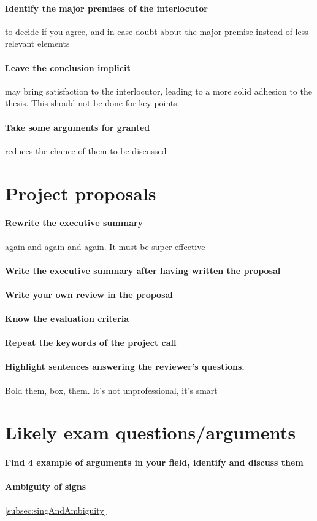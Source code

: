 \documentclass{article}
\begin{document}
\paragraph{Identify the major premises of the interlocutor} to decide if you agree, and in case doubt about the major premise instead of less relevant elements
\paragraph{Leave the conclusion implicit} may bring satisfaction to the interlocutor, leading to a more solid adhesion to the thesis. This should not be done for key points.
\paragraph{Take some arguments for granted} reduces the chance of them to be discussed

\section{Project proposals}
\paragraph{Rewrite the executive summary} again and again and again. It must be super-effective
\paragraph{Write the executive summary after having written the proposal}
\paragraph{Write your own review in the proposal}
\paragraph{Know the evaluation criteria}
\paragraph{Repeat the keywords of the project call}
\paragraph{Highlight sentences answering the reviewer's questions.} Bold them, box, them. It's not unprofessional, it's smart

\section{Likely exam questions/arguments}
\paragraph{Find 4 example of arguments in your field, identify and discuss them}
\paragraph{Ambiguity of signs} \ref{subsec:singAndAmbiguity}
\end{document}
